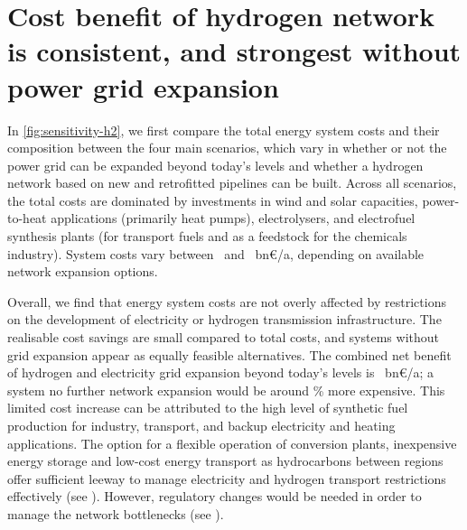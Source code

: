 
\section*{Cost benefit of hydrogen network is consistent, and strongest without power grid expansion}
\label{sec:h2}

In \cref{fig:sensitivity-h2}, we first compare the total energy system costs and
their composition between the four main scenarios, which vary in whether or not
the power grid can be expanded beyond today's levels and whether a hydrogen
network based on new and retrofitted pipelines can be built. Across all
scenarios, the total costs are dominated by investments in wind and solar
capacities, power-to-heat applications (primarily heat pumps), electrolysers,
and electrofuel synthesis plants (for transport fuels and as a feedstock for the
chemicals industry). System costs vary between \minsystemcost~and
\maxsystemcost~bn\euro/a, depending on available network expansion options.

Overall, we find that energy system costs are not overly affected by
restrictions on the development of electricity or hydrogen transmission
infrastructure. The realisable cost savings are small compared to total costs,
and systems without grid expansion appear as equally feasible alternatives. The
combined net benefit of hydrogen and electricity grid expansion beyond today's
levels is \gridbenefitabs~bn\euro/a; a system no further network expansion would
be around \gridbenefitrel\% more expensive. This limited cost increase can be
attributed to the high level of synthetic fuel production for industry,
transport, and backup electricity and heating applications. The option for a
flexible operation of conversion plants, inexpensive energy storage and low-cost
energy transport as hydrocarbons between regions offer sufficient leeway to
manage electricity and hydrogen transport restrictions effectively (see
). However, regulatory changes would be needed in order to
manage the network bottlenecks (see ).

